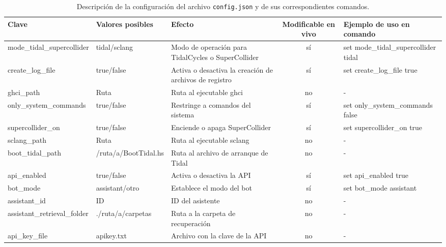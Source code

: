 \begin{landscape}
    \begin{table}[htbp]
    \centering
    \caption{Descripción de la configuración del archivo \texttt{config.json} y de sus correspondientes comandos.}
    \label{tab:config-description}
    \fontsize{9.5pt}{11pt}\selectfont
    \begin{tabularx}{\linewidth}{lXlcl}
        \toprule
        \textbf{Clave} & \textbf{Valores posibles} & \textbf{Efecto} & \textbf{Modificable en vivo} & \textbf{Ejemplo de uso en comando} \\
        \midrule
        mode\_tidal\_supercollider & tidal/sclang & Modo de operación para TidalCycles o SuperCollider & sí & set mode\_tidal\_supercollider tidal \\
        create\_log\_file & \textcolor{truecolor}{true}/\textcolor{falsecolor}{false} & Activa o desactiva la creación de archivos de registro & sí & set create\_log\_file \textcolor{truecolor}{true} \\
        ghci\_path & Ruta & Ruta al ejecutable ghci & no & - \\
        only\_system\_commands & \textcolor{truecolor}{true}/\textcolor{falsecolor}{false} & Restringe a comandos del sistema & sí & set only\_system\_commands \textcolor{falsecolor}{false} \\
        supercollider\_on & \textcolor{truecolor}{true}/\textcolor{falsecolor}{false} & Enciende o apaga SuperCollider & sí & set supercollider\_on \textcolor{truecolor}{true} \\
        sclang\_path & Ruta & Ruta al ejecutable sclang & no & - \\
        boot\_tidal\_path & \textcolor{pathcolor}{/ruta/a/BootTidal.hs} & Ruta al archivo de arranque de Tidal & no & - \\
        api\_enabled & \textcolor{truecolor}{true}/\textcolor{falsecolor}{false} & Activa o desactiva la API & sí & set api\_enabled \textcolor{truecolor}{true} \\
        bot\_mode & assistant/otro & Establece el modo del bot & sí & set bot\_mode assistant \\
        assistant\_id & ID & ID del asistente & no & - \\
        assistant\_retrieval\_folder & \textcolor{pathcolor}{./ruta/a/carpetas} & Ruta a la carpeta de recuperación & no & - \\
        api\_key\_file & \textcolor{pathcolor}{apikey.txt} & Archivo con la clave de la API & no & - \\

\end{tabularx}
\end{table}
\end{landscape}
